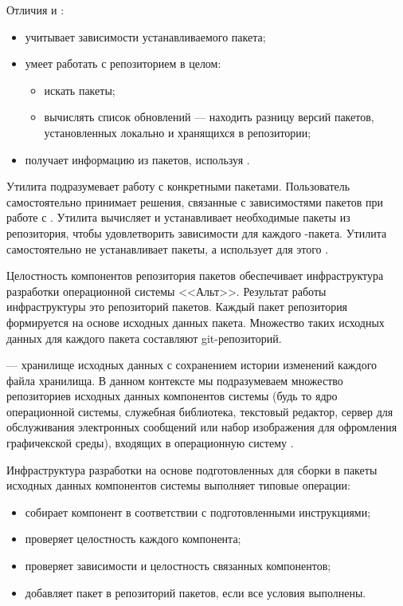 Отличия  и :
\begin{itemize}
	\item {} учитывает зависимости устанавливаемого пакета;
	\item {} умеет работать с репозиторием в целом:
	\begin{itemize}
		\item искать пакеты;
		\item вычислять список обновлений --- находить разницу версий пакетов,
		установленных локально и хранящихся в репозитории;
	\end{itemize}
	\item {} получает информацию из пакетов, используя .
\end{itemize}

Утилита  подразумевает работу с конкретными пакетами. Пользователь самостоятельно
принимает решения, связанные с зависимостями пакетов  при работе с . Утилита 
вычисляет и устанавливает необходимые пакеты из репозитория, чтобы удовлетворить зависимости для
каждого -пакета. Утилита  самостоятельно не устанавливает пакеты, а использует для этого .


Целостность компонентов репозитория пакетов обеспечивает инфраструктура разработки операционной системы <<Альт>>.
Результат работы инфраструктуры это репозиторий пакетов. Каждый пакет репозитория формируется на
основе исходных данных пакета. Множество таких исходных данных для каждого пакета составляют git-репозиторий.

 --- хранилище исходных данных с сохранением истории изменений каждого файла
хранилища. В данном контексте мы подразумеваем множество репозиториев исходных данных компонентов
системы (будь то ядро операционной системы, служебная библиотека, текстовый редактор, сервер для обслуживания
электронных сообщений или набор изображения для офромления графичекской среды), входящих в операционную
систему .

Инфраструктура разработки  на основе подготовленных для сборки в пакеты исходных данных компонентов
системы выполняет типовые операции:
\begin{itemize}
	\item собирает компонент в соответствии с подготовленными инструкциями;
	\item проверяет целостность каждого компонента;
	\item проверяет зависимости и целостность связанных компонентов;
	\item добавляет пакет в репозиторий пакетов, если все условия выполнены.
\end{itemize}

